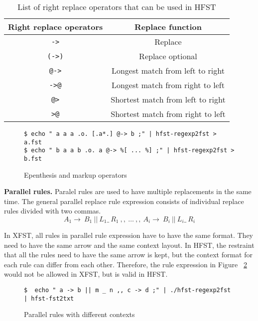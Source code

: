 \documentclass{llncs}
\begin{document}
\begin{table} [h!]
\centering
\begin{tabular}{| c | c |} 
\hline
Right replace operators & Replace function \\ \hline\hline
\verb!->!   & Replace \\ \hline
\verb!(->)! & Replace optional \\ \hline
\verb!@->!  & Longest match from left to right \\ \hline
\verb!->@!  & Longest match from right to left \\ \hline
\verb!@>!   & Shortest match from left to right \\ \hline
\verb!>@!   & Shortest match from right to left \\ \hline
\end{tabular}
\caption{List of right replace operators that can be used in HFST}
\label{tab:replace_operators}
\end{table}



\begin{figure} [h!]
 \begin{verbatim}
$ echo " a a a .o. [.a*.] @-> b ;" | hfst-regexp2fst > a.fst
$ echo " b a a b .o. a @-> %[ ... %] ;" | hfst-regexp2fst > b.fst
\end{verbatim}
\caption{Epenthesis and markup operators}
\label{fig:epenthesis_markup}
\end{figure}



\textbf{Parallel rules.} Paralel rules are used to have multiple replacements in the same time. The general parallel replace rule expression consists of individual replace rules divided with two commas.
\begin{equation}
A_1 \rightarrow\ B_1\ ||\ L_1 \_\  R_1\ ,,\ \ldots\ ,,\ A_i \rightarrow\ B_i\ ||\ L_i \_\ R_i
\end{equation}

In XFST, all rules in parallel rule expression have to have the same format. They need to have the same arrow and the same context layout. In HFST, the restraint that all the rules need to have the same arrow is kept, but the context format for each rule can differ from each other. Therefore, the rule expression in Figure ~\ref{fig:parallel_rules} would not be allowed in XFST, but is valid in HFST.
\begin{figure}
 \begin{verbatim}
$  echo " a -> b || m _ n ,, c -> d ;" | ./hfst-regexp2fst | hfst-fst2txt
\end{verbatim}
\caption{Parallel rules with different contexts}
\label{fig:parallel_rules}
\end{figure}
\end{document}
